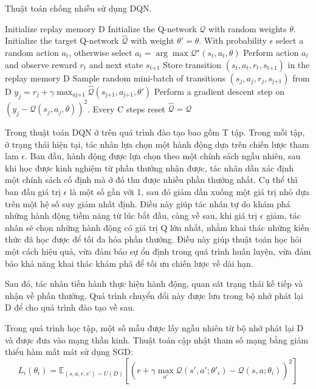 \documentclass{uetgraduation}
\begin{document}
\begin{algorithm}
    \caption{Thuật toán chống nhiễu sử dụng DQN.}\label{alg:dqn}
    \begin{algorithmic}[1]
    \State Initialize replay memory D
    \State Initialize the Q-network $\mathcal{Q}$ with random weights $\theta$.
    \State Initialize the target Q-network $\hat{\mathcal{Q}}$ with weight $\theta' = \theta$.
        \State With probability $\epsilon$ select a random action $a_t$, otherwise select $a_t = \arg \max \mathcal{Q}^\star (s_t, a_t, \theta)$
        \State Perform action $a_t$ and observe reward $r_t$ and next state $s_\text{t+1}$
        \State Store transition $(s_t,a_t,r_t,s_\text{t+1})$ in the replay memory D
        \State Sample random mini-batch of transitions $(s_j,a_j,r_j,s_\text{j+1})$ from D
        \State $y_j = r_j + \gamma \max_{a\text{j+1}} \hat{\mathcal{Q}} (s_\text{j+1}, a_\text{j+1}, \theta')$
        \State Perform a gradient descent step on $(y_j - \mathcal{Q} (s_j, a_j, \theta))^2$.
        \State Every C steps reset $\hat{\mathcal{Q}} = \mathcal{Q}$
    \EndFor
\end{algorithmic}
\end{algorithm}

Trong thuật toán DQN ở trên quá trình đào tạo bao gồm T tập. Trong mỗi tập, ở trạng thái hiện tại, tác nhân lựa chọn một hành động dựa trên chiến lược tham lam $\epsilon$.
Ban đầu, hành động được lựa chọn theo một chính sách ngẫu nhiên, sau khi học được kinh nghiệm từ phần thưởng nhận được, tác nhân dần xác định một chính sách cố định mà ở
đó thu được nhiều phần thưởng nhất. Cụ thể thì ban đầu giá trị $\epsilon$ là một số gần với 1, sau đó giảm dần xuống một giá trị nhỏ dựa trên một hệ số suy giảm nhất định.
Điều này giúp tác nhân tự do khám phá những hành động tiềm năng từ lúc bắt đầu, càng về sau, khi giá trị $\epsilon$ giảm, tác nhân sẽ chọn những hành động có giá trị Q lớn
nhất, nhằm khai thác những kiến thức đã học được để tối đa hóa phần thưởng. Điều này giúp thuật toán học hỏi một cách hiệu quả, vừa đảm bảo sự ổn định trong quá trình
huấn luyện, vừa đảm bảo khả năng khai thác khám phá để tối ưu chiến lược về dài hạn.

Sau đó, tác nhân tiến hành thực hiện hành động, quan sát trạng thái kế tiếp và nhận về phần thưởng. Quá trình chuyển đổi này được lưu trong bộ nhớ phát lại D để cho
quá trình đào tạo về sau.

Trong quá trình học tập, một số mẫu được lấy ngẫu nhiên từ bộ nhớ phát lại D và được đưa vào mạng thần kinh. Thuật toán cập nhật tham số mạng bằng giảm thiểu hàm mất mát
sử dụng SGD:
\begin{equation}
    L_i(\theta_i) = \mathbb{E}_{(s, a, r, s') \sim U(D)} \left[ \left( r + \gamma \max_{a'} \mathcal{Q}(s', a'; \theta'_i) - \mathcal{Q}(s, a; \theta_i) \right)^2 \right]
\end{equation}
\end{document}
